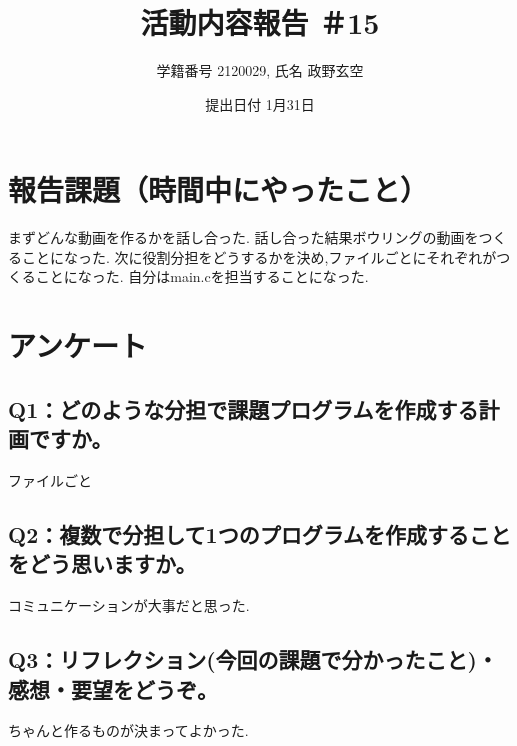 \documentclass[12pt,a4j]{jarticle}
\begin{document}
\title{活動内容報告 ＃15}
\author{学籍番号 2120029, 氏名 政野玄空}
\date{提出日付 1月31日}
\maketitle

\section{報告課題（時間中にやったこと）}
まずどんな動画を作るかを話し合った.
話し合った結果ボウリングの動画をつくることになった.
次に役割分担をどうするかを決め,ファイルごとにそれぞれがつくることになった.
自分はmain.cを担当することになった.

\section{アンケート}

\subsection{Q1：どのような分担で課題プログラムを作成する計画ですか。}

ファイルごと

\subsection{Q2：複数で分担して1つのプログラムを作成することをどう思いますか。}
コミュニケーションが大事だと思った.

\subsection{Q3：リフレクション(今回の課題で分かったこと)・感想・要望をどうぞ。}

ちゃんと作るものが決まってよかった.
\end{document}
